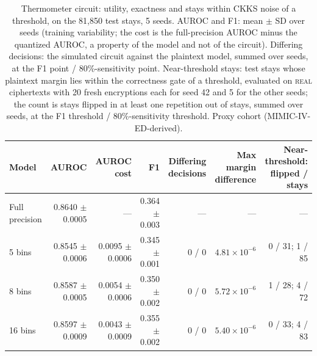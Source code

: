 \begin{table}[t]
\centering
\caption{Thermometer circuit: utility, exactness and stays within CKKS noise of a threshold, on the 81,850 test stays, 5 seeds. AUROC and F1: mean $\pm$ SD over seeds (training variability; the cost is the full-precision AUROC minus the quantized AUROC, a property of the model and not of the circuit). Differing decisions: the simulated circuit against the plaintext model, summed over seeds, at the F1 point / 80\%-sensitivity point. Near-threshold stays\added{}: test stays whose plaintext margin lies within the correctness gate of a threshold, evaluated on \textsc{real} ciphertexts with 20 fresh encryptions each for seed 42 and 5 for the other seeds; the count is stays flipped in at least one repetition out of stays, summed over seeds, at the F1 threshold / 80\%-sensitivity threshold. Proxy cohort (MIMIC-IV-ED-derived).}
\label{tab:t15_thermometer_exactness}
\begin{tabular}{lrrrrrr}
\toprule
Model & AUROC & AUROC cost & F1 & Differing decisions & Max margin difference & Near-threshold: flipped / stays \\
\midrule
Full precision & 0.8640 $\pm$ 0.0005 & --- & 0.364 $\pm$ 0.003 & --- & --- & --- \\
5 bins & 0.8545 $\pm$ 0.0006 & 0.0095 $\pm$ 0.0006 & 0.345 $\pm$ 0.001 & 0 / 0 & $4.81 \times 10^{-6}$ & 0 / 31; 1 / 85 \\
8 bins & 0.8587 $\pm$ 0.0005 & 0.0054 $\pm$ 0.0006 & 0.350 $\pm$ 0.002 & 0 / 0 & $5.72 \times 10^{-6}$ & 1 / 28; 4 / 72 \\
16 bins & 0.8597 $\pm$ 0.0009 & 0.0043 $\pm$ 0.0009 & 0.355 $\pm$ 0.002 & 0 / 0 & $5.40 \times 10^{-6}$ & 0 / 33; 4 / 83 \\
\bottomrule
\end{tabular}
\end{table}
